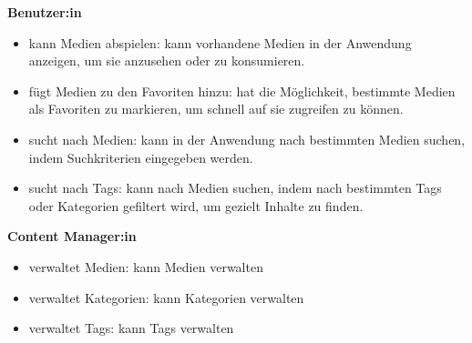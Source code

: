 





\textbf{Benutzer:in}
\begin{itemize}
    \item kann Medien abspielen: kann vorhandene Medien in der Anwendung anzeigen, um sie anzusehen oder zu konsumieren.
    \item fügt Medien zu den Favoriten hinzu: hat die Möglichkeit, bestimmte Medien als Favoriten zu markieren, um schnell auf sie zugreifen zu können.
    \item sucht nach Medien: kann in der Anwendung nach bestimmten Medien suchen, indem Suchkriterien eingegeben werden.
    \item sucht nach Tags: kann nach Medien suchen, indem nach bestimmten Tags oder Kategorien gefiltert wird, um gezielt Inhalte zu finden.
\end{itemize}
\textbf{Content Manager:in}
\begin{itemize}
    \item verwaltet Medien: kann Medien verwalten
    \item verwaltet Kategorien: kann Kategorien verwalten
    \item verwaltet Tags: kann Tags verwalten
\end{itemize}

